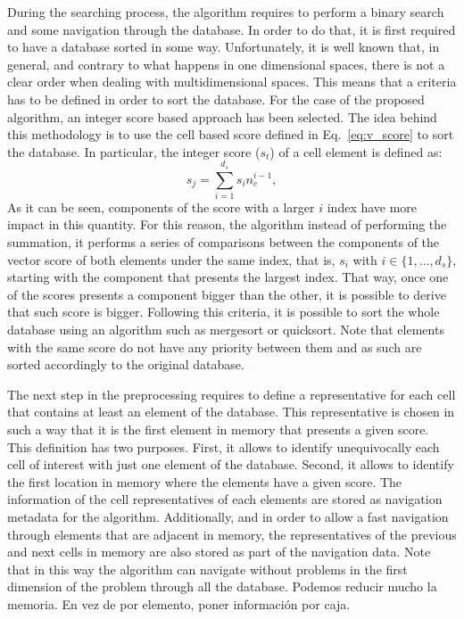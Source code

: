 \documentclass[preprint,12pt]{elsarticle}
\begin{document}
During the searching process, the algorithm requires to perform a binary search and some navigation through the database. In order to do that, it is first required to have a database sorted in some way. Unfortunately, it is well known that, in general, and contrary to what happens in one dimensional spaces, there is not a clear order when dealing with multidimensional spaces. This means that a criteria has to be defined in order to sort the database. For the case of the proposed algorithm, an integer score based approach has been selected. The idea behind this methodology is to use the cell based score defined in Eq.~\eqref{eq:v_score} to sort the database. In particular, the integer score ($s_t$) of a cell element is defined as:
\begin{equation}
s_j = \sum_{i = 1}^{d_s}s_in_c^{i-1}, 
\end{equation}
As it can be seen, components of the score with a larger $i$ index have more impact in this quantity. For this reason, the algorithm instead of performing the summation, it performs a series of comparisons between the components of the vector score of both elements under the same index, that is, $s_i$ with $i\in \{1,\dots,d_s\}$, starting with the component that presents the largest index. That way, once one of the scores presents a component bigger than the other, it is possible to derive that such score is bigger. Following this criteria, it is possible to sort the whole database using an algorithm such as mergesort or quicksort. Note that elements with the same score do not have any priority between them and as such are sorted accordingly to the original database.

The next step in the preprocessing requires to define a representative for each cell that contains at least an element of the database. This representative is chosen in such a way that it is the first element in memory that presents a given score. This definition has two purposes. First, it allows to identify unequivocally each cell of interest with just one element of the database. Second, it allows to identify the first location in memory where the elements have a given score. The information of the cell representatives of each elements are stored as navigation metadata for the algorithm. Additionally, and in order to allow a fast navigation through elements that are adjacent in memory, the representatives of the previous and next cells in memory are also stored as part of the navigation data. Note that in this way the algorithm can navigate without problems in the first dimension of the problem through all the database. \color{red} Podemos reducir mucho la memoria. En vez de por elemento, poner informaci\'on por caja.  \color{black}
\end{document}
